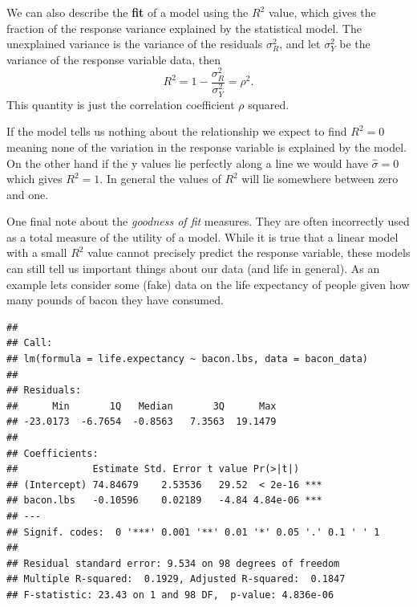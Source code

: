 \documentclass[
]{book}
\newenvironment{Shaded}{\begin{snugshade}}{\end{snugshade}}
\newcommand{\AttributeTok}[1]{\textcolor[rgb]{0.77,0.63,0.00}{#1}}
\newcommand{\FunctionTok}[1]{\textcolor[rgb]{0.00,0.00,0.00}{#1}}
\newcommand{\NormalTok}[1]{#1}
\newcommand{\OtherTok}[1]{\textcolor[rgb]{0.56,0.35,0.01}{#1}}
\newcommand{\SpecialCharTok}[1]{\textcolor[rgb]{0.00,0.00,0.00}{#1}}
\newcommand{\StringTok}[1]{\textcolor[rgb]{0.31,0.60,0.02}{#1}}
\theoremstyle{definition}
\theoremstyle{definition}
\theoremstyle{definition}
\theoremstyle{definition}
\theoremstyle{remark}
\begin{document}
We can also describe the \textbf{fit} of a model using the \(R^2\) value, which gives the fraction of the response variance explained by the statistical model. The unexplained variance is the variance of the residuals \(\sigma_R^2\), and let \(\sigma_Y^2\) be the variance of the response variable data, then \[R^2=1-\frac{\sigma_R^2}{\sigma_Y^2}=\rho^2.\] This quantity is just the correlation coefficient \(\rho\) squared.

If the model tells us nothing about the relationship we expect to find \(R^2=0\) meaning none of the variation in the response variable is explained by the model. On the other hand if the y values lie perfectly along a line we would have \(\hat{\sigma}=0\) which gives \(R^2=1\). In general the values of \(R^2\) will lie somewhere between zero and one.

One final note about the \emph{goodness of fit} measures. They are often incorrectly used as a total measure of the utility of a model. While it is true that a linear model with a small \(R^2\) value cannot precisely predict the response variable, these models can still tell us important things about our data (and life in general). As an example lets consider some (fake) data on the life expectancy of people given how many pounds of bacon they have consumed.

\begin{Shaded}
\end{Shaded}

\begin{verbatim}
## 
## Call:
## lm(formula = life.expectancy ~ bacon.lbs, data = bacon_data)
## 
## Residuals:
##      Min       1Q   Median       3Q      Max 
## -23.0173  -6.7654  -0.8563   7.3563  19.1479 
## 
## Coefficients:
##             Estimate Std. Error t value Pr(>|t|)    
## (Intercept) 74.84679    2.53536   29.52  < 2e-16 ***
## bacon.lbs   -0.10596    0.02189   -4.84 4.84e-06 ***
## ---
## Signif. codes:  0 '***' 0.001 '**' 0.01 '*' 0.05 '.' 0.1 ' ' 1
## 
## Residual standard error: 9.534 on 98 degrees of freedom
## Multiple R-squared:  0.1929, Adjusted R-squared:  0.1847 
## F-statistic: 23.43 on 1 and 98 DF,  p-value: 4.836e-06
\end{verbatim}
\end{document}
